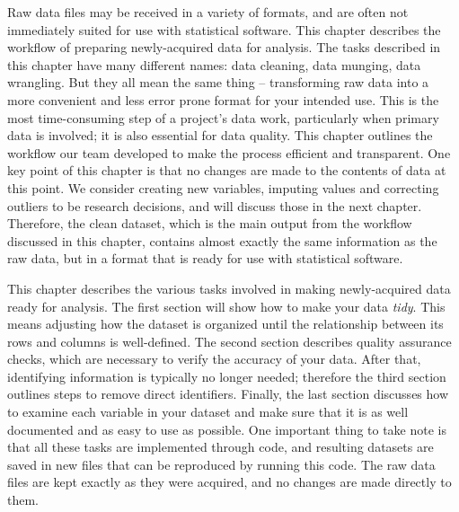 
\begin{fullwidth}

Raw data files may be received in a variety of formats,
and are often not immediately suited for use with statistical software.
This chapter describes the workflow of preparing newly-acquired data for analysis.
The tasks described in this chapter have many different names:
data cleaning, data munging, data wrangling.
But they all mean the same thing --
transforming raw data into a more convenient and less error prone format for your intended use.
This is the most time-consuming step of a project's data work,
particularly when primary data is involved;
it is also essential for data quality.
This chapter outlines the workflow our team developed to make the process efficient and transparent.
One key point of this chapter is that no changes are made to the contents of data at this point.
We consider creating new variables, imputing values and correcting outliers
to be research decisions, and will discuss those in the next chapter.
Therefore, the clean dataset,
which is the main output from the workflow discussed in this chapter,
contains almost exactly the same information as the raw data,
but in a format that is ready for use with statistical software.

This chapter describes the various tasks involved in making newly-acquired data ready for analysis.
The first section will show how to make your data \textit{tidy}.
This means adjusting how the dataset is organized
until the relationship between its rows and columns is well-defined.
The second section describes quality assurance checks,
which are necessary to verify the accuracy of your data.
After that, identifying information is typically no longer needed;
therefore the third section outlines steps to remove direct identifiers.
Finally, the last section discusses how to examine each variable in your dataset and
make sure that it is as well documented and as easy to use as possible.
One important thing to take note is that all these tasks are implemented through code,
and resulting datasets are saved in new files that can be reproduced by running this code.
The raw data files are kept exactly as they were acquired,
and no changes are made directly to them.

\end{fullwidth}



